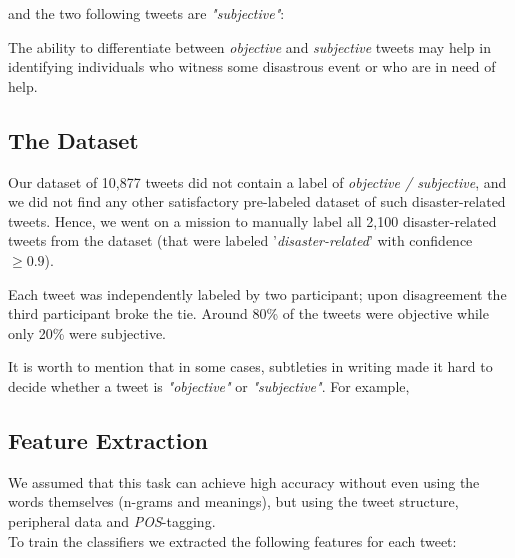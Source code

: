 \documentclass[letterpaper,twocolumn,10pt]{article}
\begin{document}
and the two following tweets are \textit{"subjective"}:

\begin{center}
	\parbox{190pt}{}
\end{center}

\begin{center}
	\parbox{190pt}{}
\end{center}

The ability to differentiate between \textit{objective} and \textit{subjective} tweets may help in identifying individuals who witness some disastrous event or who are in need of help.

\subsection{The Dataset}

Our dataset of 10,877 tweets did not contain a label of \textit{objective / subjective}, and we did not find any other satisfactory pre-labeled dataset of such disaster-related tweets. Hence, we went on a mission to manually label all 2,100 disaster-related tweets from the dataset (that were labeled '\textit{disaster-related}' with confidence $ \ge 0.9 $).

Each tweet was independently labeled by two participant; upon disagreement the third participant broke the tie. Around 80\% of the tweets were objective while only 20\% were subjective.

It is worth to mention that in some cases, subtleties in writing made it hard to decide whether a tweet is \textit{"objective"} or \textit{"subjective"}. For example,

\begin{center}
	\parbox{190pt}{}
\end{center}

\subsection{Feature Extraction}

We assumed that this task can achieve high accuracy without even using the words themselves (n-grams and meanings), but using the tweet structure, peripheral data and \textit{POS}-tagging. \\
To train the classifiers we extracted the following features for each tweet:
\end{document}
